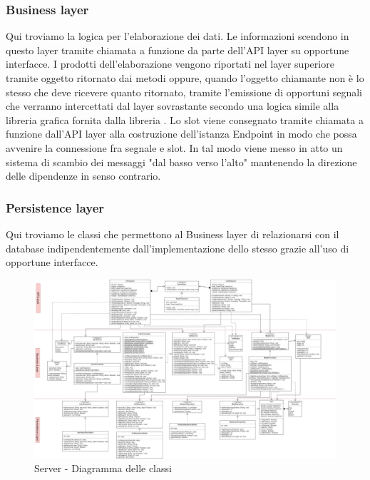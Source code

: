 \subsubsection{Business layer}
Qui troviamo la logica per l'elaborazione dei dati. Le informazioni scendono in questo layer tramite chiamata a funzione da parte dell'API layer su opportune interfacce. I prodotti dell'elaborazione vengono riportati nel layer superiore tramite oggetto ritornato dai metodi oppure, quando l'oggetto chiamante non è lo stesso che deve ricevere quanto ritornato, tramite l'emissione di opportuni segnali che verranno intercettati dal layer sovrastante secondo una logica  simile alla libreria grafica  fornita dalla libreria . Lo slot viene consegnato tramite chiamata a funzione dall'API layer alla costruzione dell'istanza Endpoint in modo che possa avvenire la connessione fra segnale e slot. In tal modo viene messo in atto un sistema di scambio dei messaggi "dal basso verso l'alto" mantenendo la direzione delle dipendenze in senso contrario.

\subsubsection{Persistence layer}
Qui troviamo le classi che permettono al Business layer di relazionarsi con il database indipendentemente dall'implementazione dello stesso grazie all'uso di opportune interfacce.

\begin{landscape}
    \begin{figure}[h!]
        \includegraphics[width=26cm]{img/server_classi.png}
        \caption{Server - Diagramma delle classi}
    \end{figure}
\end{landscape}

